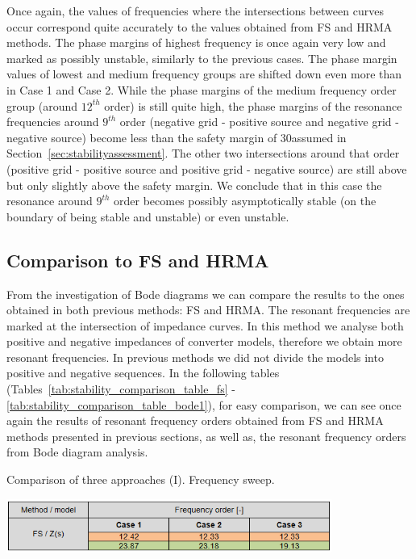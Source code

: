 \documentclass[a4paper,11pt,oneside]{report} %
\begin{document}
Once again, the values of frequencies where the intersections between curves occur correspond quite accurately to the values obtained from FS and HRMA methods. The phase margins of highest frequency is once again very low and marked as possibly unstable, similarly to the previous cases. The phase margin values of lowest and medium frequency groups are shifted down even more than in Case 1 and Case 2. While the phase margins of the medium frequency order group (around $12^{th}$ order) is still quite high, the phase margins of the resonance frequencies around $9^{th}$ order (negative grid - positive source and negative grid - negative source) become less than the safety margin of 30\degree assumed in Section~\ref{sec:stabilityassessment}. The other two intersections around that order (positive grid - positive source and positive grid - negative source) are still above but only slightly above the safety margin. We conclude that in this case the resonance around $9^{th}$ order becomes possibly asymptotically stable (on the boundary of being stable and unstable) or even unstable.

\subsection{Comparison to FS and HRMA}
From the investigation of Bode diagrams we can compare the results to the ones obtained in both previous methods: FS and HRMA. The resonant frequencies are marked at the intersection of impedance curves. In this method we analyse both positive and negative impedances of converter models, therefore we obtain more resonant frequencies. In previous methods we did not divide the models into positive and negative sequences. In the following tables (Tables~\ref{tab:stability_comparison_table_fs} - \ref{tab:stability_comparison_table_bode1}), for easy comparison, we can see once again the results of resonant frequency orders obtained from FS and HRMA methods presented in previous sections, as well as, the resonant frequency orders from Bode diagram analysis.

\begin{table}[htb]
	\centering
	\caption{Comparison of three approaches (I). Frequency sweep.}
	\includegraphics[width=0.8\textwidth]{img/Case123/stability_comparison_table_fs.png}
  	\label{tab:stability_comparison_table_fs}
\end{table}
\FloatBarrier
\end{document}
